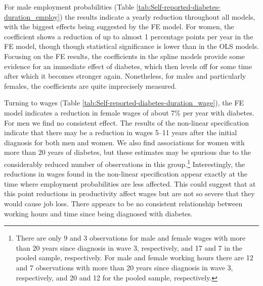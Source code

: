 For male employment probabilities (Table \ref{tab:Self-reported-diabetes-duration_employ}) the results indicate a yearly reduction throughout all models, with the biggest effects being suggested by the \ac{FE} model. For women, the coefficient shows a reduction of up to almost 1 percentage points per year in the \ac{FE} model, though though statistical significance is lower than in the \ac{OLS} models. Focusing on the \ac{FE} results, the coefficients in the spline models provide some evidence for an immediate effect of diabetes, which then levels off for some time after which it becomes stronger again. Nonetheless, for males and particularly females, the coefficients are quite imprecisely measured.

Turning to wages (Table \ref{tab:Self-reported-diabetes-duration_wage}), the \ac{FE} model indicates a reduction in female wages of about 7\% per year with diabetes. For men we find no consistent effect. The results of the non-linear specification indicate that there may be a reduction in wages 5--11 years after the initial diagnosis for both men and women. We also find associations for women with more than 20 years of diabetes, but these estimates may be spurious due to the considerably reduced number of observations in this group.\footnote{There are only 9 and 3 observations for male and female wages with more than 20 years since diagnosis in wave 3, respectively, and 17 and 7 in the pooled sample, respectively. For male and female working hours there are 12 and 7 observations with more than 20 years since diagnosis in wave 3, respectively, and 20 and 12 for the pooled sample, respectively.} Interestingly, the reductions in wages found in the non-linear specification appear exactly at the time where employment probabilities are less affected. This could suggest that at this point reductions in productivity affect wages but are not so severe that they would cause job loss. There appears to be no consistent relationship between working hours and time since being diagnosed with diabetes.


